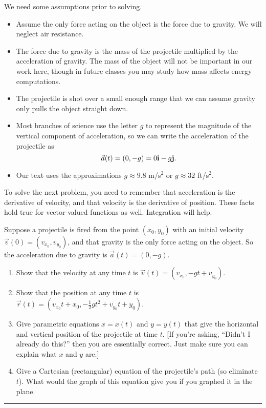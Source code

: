 We need some assumptions prior to solving. 
\begin{itemize}
 \item Assume the only force acting on the object is the force due to gravity. We will neglect air resistance. 
 \item The force due to gravity is the mass of the projectile multiplied by the acceleration of gravity. The mass of the object will not be important in our work here, though in future classes you may study how mass affects energy computations. 
 \item The projectile is shot over a small enough range that we can assume gravity only pulls the object straight down.
 \item Most branches of science use the letter $g$ to represent the magnitude of the vertical component of acceleration, so we can write the acceleration of the projectile as 
$$\vec a(t) = (0,-g) = 0{\bf i}-g{\bf j}.$$ 
 \item Our text uses the approximations $g\approx 9.8$ m/s$^2$ or $g\approx32$ ft/s$^2$. 
\end{itemize}

To solve the next problem, you need to remember that acceleration is the derivative of velocity, and that velocity is the derivative of position.  These facts hold true for vector-valued functions as well. Integration will help.

\begin{problem}
Suppose a projectile is fired from the point $(x_0,y_0)$ with an initial velocity $\vec v(0)=(v_{x_0},v_{y_0})$, and that gravity is the only force acting on the object. So the acceleration due to gravity is $\vec a(t) = (0,-g)$.
\begin{enumerate}
 \item Show that the velocity at any time $t$ is $\vec v(t) = (v_{x_0},-gt+v_{y_0})$.
 \item Show that the position at any time $t$ is $\vec r(t) = (v_{x_0}t+x_0,-\frac{1}{2}gt^2+v_{y_0}t+y_0)$. 
 \item Give parametric equations $x=x(t)$ and $y=y(t)$ that give the horizontal and vertical position of the projectile at time $t$. [If you're asking, ``Didn't I already do this?'' then you are essentially correct.  Just make sure you can explain what $x$ and $y$ are.] 
 \item Give a Cartesian (rectangular) equation of the projectile's path (so eliminate $t$).  What would the graph of this equation give you if you graphed it in the plane.
\end{enumerate}
\hrule\end{problem}

